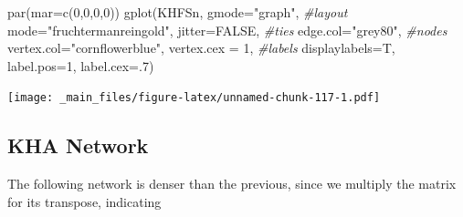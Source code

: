 \documentclass[
  notitlepage,
  onecolumn,
  openany]{book}
\newenvironment{Shaded}{\begin{snugshade}}{\end{snugshade}}
\newcommand{\AttributeTok}[1]{\textcolor[rgb]{0.77,0.63,0.00}{#1}}
\newcommand{\CommentTok}[1]{\textcolor[rgb]{0.56,0.35,0.01}{\textit{#1}}}
\newcommand{\ConstantTok}[1]{\textcolor[rgb]{0.00,0.00,0.00}{#1}}
\newcommand{\DecValTok}[1]{\textcolor[rgb]{0.00,0.00,0.81}{#1}}
\newcommand{\FunctionTok}[1]{\textcolor[rgb]{0.00,0.00,0.00}{#1}}
\newcommand{\NormalTok}[1]{#1}
\newcommand{\StringTok}[1]{\textcolor[rgb]{0.31,0.60,0.02}{#1}}
\begin{document}
\begin{Shaded}
\begin{Highlighting}[]
\FunctionTok{par}\NormalTok{(}\AttributeTok{mar=}\FunctionTok{c}\NormalTok{(}\DecValTok{0}\NormalTok{,}\DecValTok{0}\NormalTok{,}\DecValTok{0}\NormalTok{,}\DecValTok{0}\NormalTok{))}
\FunctionTok{gplot}\NormalTok{(KHFSn, }
      \AttributeTok{gmode=}\StringTok{"graph"}\NormalTok{,}
      \CommentTok{\#layout}
      \AttributeTok{mode=}\StringTok{"fruchtermanreingold"}\NormalTok{,}
      \AttributeTok{jitter=}\ConstantTok{FALSE}\NormalTok{,}
      \CommentTok{\#ties}
      \AttributeTok{edge.col=}\StringTok{"grey80"}\NormalTok{,}
      \CommentTok{\#nodes}
      \AttributeTok{vertex.col=}\StringTok{"cornflowerblue"}\NormalTok{,}
      \AttributeTok{vertex.cex =} \DecValTok{1}\NormalTok{,}
      \CommentTok{\#labels}
      \AttributeTok{displaylabels=}\NormalTok{T,}
      \AttributeTok{label.pos=}\DecValTok{1}\NormalTok{,}
      \AttributeTok{label.cex=}\NormalTok{.}\DecValTok{7}\NormalTok{)}
\end{Highlighting}
\end{Shaded}

\texttt{[image: \_main\_files/figure-latex/unnamed-chunk-117-1.pdf]}

\hypertarget{kha-network}{%
\subsection{KHA Network}\label{kha-network}}

The following network is denser than the previous, since we multiply the matrix for its transpose, indicating
\end{document}
